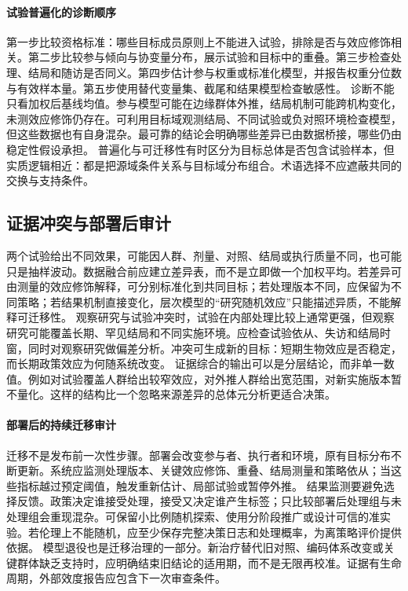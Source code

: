 \paragraph{试验普遍化的诊断顺序}

第一步比较资格标准：哪些目标成员原则上不能进入试验，排除是否与效应修饰相关。第二步比较参与倾向与协变量分布，展示试验和目标中的重叠。第三步检查处理、结局和随访是否同义。第四步估计参与权重或标准化模型，并报告权重分位数与有效样本量。第五步使用替代变量集、截尾和结果模型检查敏感性。
诊断不能只看加权后基线均值。参与模型可能在边缘群体外推，结局机制可能跨机构变化，未测效应修饰仍存在。可利用目标域观测结局、不同试验或负对照环境检查模型，但这些数据也有自身混杂。最可靠的结论会明确哪些差异已由数据桥接，哪些仍由稳定性假设承担。
普遍化与可迁移性有时区分为目标总体是否包含试验样本，但实质逻辑相近：都是把源域条件关系与目标域分布组合。术语选择不应遮蔽共同的交换与支持条件。

\subsection{证据冲突与部署后审计}

两个试验给出不同效果，可能因人群、剂量、对照、结局或执行质量不同，也可能只是抽样波动。数据融合前应建立差异表，而不是立即做一个加权平均。若差异可由测量的效应修饰解释，可分别标准化到共同目标；若处理版本不同，应保留为不同策略；若结果机制直接变化，层次模型的“研究随机效应”只能描述异质，不能解释可迁移性。
观察研究与试验冲突时，试验在内部处理比较上通常更强，但观察研究可能覆盖长期、罕见结局和不同实施环境。应检查试验依从、失访和结局时窗，同时对观察研究做偏差分析。冲突可生成新的目标：短期生物效应是否稳定，而长期政策效应为何随系统改变。
证据综合的输出可以是分层结论，而非单一数值。例如对试验覆盖人群给出较窄效应，对外推人群给出宽范围，对新实施版本暂不量化。这样的结构比一个忽略来源差异的总体元分析更适合决策。

\paragraph{部署后的持续迁移审计}

迁移不是发布前一次性步骤。部署会改变参与者、执行者和环境，原有目标分布不断更新。系统应监测处理版本、关键效应修饰、重叠、结局测量和策略依从；当这些指标越过预定阈值，触发重新估计、局部试验或暂停外推。
结果监测要避免选择反馈。政策决定谁接受处理，接受又决定谁产生标签；只比较部署后处理组与未处理组会重现混杂。可保留小比例随机探索、使用分阶段推广或设计可信的准实验。若伦理上不能随机，应至少保存完整决策日志和处理概率，为离策略评价提供依据。
模型退役也是迁移治理的一部分。新治疗替代旧对照、编码体系改变或关键群体缺乏支持时，应明确结束旧结论的适用期，而不是无限再校准。证据有生命周期，外部效度报告应包含下一次审查条件。

